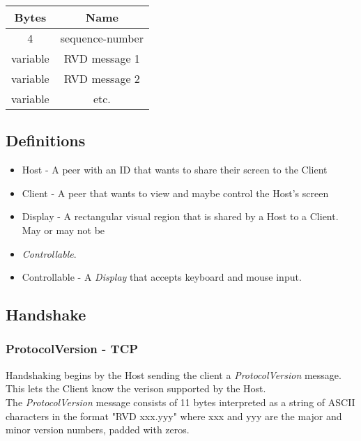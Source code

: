 \begin{center}
    \begin{tabular}{|c|c|}
        \hline
        \textbf{Bytes} & \textbf{Name}   \\
        \hline
        4              & sequence-number \\
        \hline
        variable       & RVD message 1   \\
        \hline
        variable       & RVD message 2   \\
        \hline
        \hline
        variable       & etc.            \\
        \hline
    \end{tabular}
\end{center}

\subsection{Definitions}

\begin{itemize}
    \item Host - A peer with an ID that wants to share their screen to the Client
    \item Client - A peer that wants to view and maybe control the Host's screen
    \item Display - A rectangular visual region that is shared by a Host to a Client. May or may not be
    \item \emph{Controllable}.
    \item Controllable - A \emph{Display} that accepts keyboard and mouse input.
\end{itemize}

\subsection{Handshake}

\subsubsection{ProtocolVersion - TCP}
Handshaking begins by the Host sending the client a \emph{ProtocolVersion} message. This lets the Client know the
verison supported by the Host.\\

The \emph{ProtocolVersion} message consists of 11 bytes interpreted as a string of ASCII characters in the format
"RVD xxx.yyy" where xxx and yyy are the major and minor version numbers, padded with zeros.

